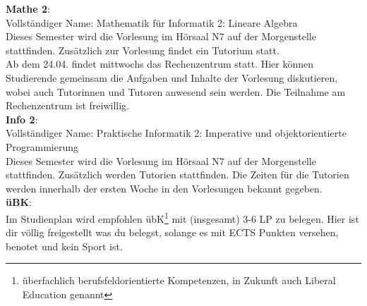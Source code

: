 \textbf{Mathe 2}:\\
Vollständiger Name: Mathematik für Informatik 2: Lineare Algebra\\
Dieses Semester wird die Vorlesung im Hörsaal N7 auf der Morgenstelle stattfinden.
Zusätzlich zur Vorlesung findet ein Tutorium statt. \\
Ab dem 24.04. findet mittwochs das Rechenzentrum statt. Hier können Studierende gemeinsam die Aufgaben und Inhalte der Vorlesung diskutieren,
wobei auch Tutorinnen und Tutoren anwesend sein werden. Die Teilnahme am Rechenzentrum ist freiwillig.\\

\textbf{Info 2}:\\
Vollständiger Name: Praktische Informatik 2: Imperative und objektorientierte Programmierung\\
Dieses Semester wird die Vorlesung im Hörsaal N7 auf der Morgenstelle stattfinden.
Zusätzlich werden Tutorien stattfinden.
Die Zeiten für die Tutorien werden innerhalb der ersten Woche in den Vorlesungen bekannt gegeben.\\

\textbf{üBK}:\\
Im Studienplan wird empfohlen übK\footnote{überfachlich berufsfeldorientierte Kompetenzen, in Zukunft auch Liberal Education genannt}
mit (insgesamt) 3-6 LP zu belegen. Hier ist dir völlig freigestellt was du belegst, solange es mit ECTS Punkten versehen, benotet und kein Sport ist.\\

\pagebreak
